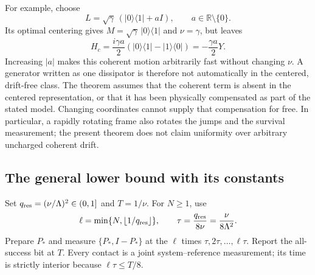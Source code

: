 \documentclass[11pt,a4paper]{article}
\numberwithin{equation}{section}
\theoremstyle{remark}
\newcommand{\R}{\mathbb R}
\begin{document}
For example, choose
\begin{equation}
 L=\sqrt\gamma\,(|0\rangle\langle1|+aI),
 \qquad a\in\R\setminus\{0\}.
\end{equation}
Its optimal centering gives
$M=\sqrt\gamma\,|0\rangle\langle1|$ and $\nu=\gamma$, but leaves
\begin{equation}
 H_c=\frac{i\gamma a}{2}
       (|0\rangle\langle1|-|1\rangle\langle0|)
     =-\frac{\gamma a}{2}Y.
\end{equation}
Increasing $|a|$ makes this coherent motion arbitrarily fast without
changing $\nu$. A generator written as one dissipator is therefore not
automatically in the centered, drift-free class. The theorem assumes
that the coherent term is absent in the centered representation, or
that it has been physically compensated as part of the stated model.
Changing coordinates cannot supply that compensation for free. In
particular, a rapidly rotating frame also rotates the jumps and the
survival measurement; the present theorem does not claim uniformity
over arbitrary uncharged coherent drift.

\subsection{The general lower bound with its constants}

Set $q_{\rm res}=(\nu/\Lambda)^2\in(0,1]$ and $T=1/\nu$. For $N\geq1$, use
\begin{equation}
 \ell=\min\{N,\lfloor1/q_{\rm res}\rfloor\},\qquad
 \tau=\frac{q_{\rm res}}{8\nu}=\frac{\nu}{8\Lambda^2}.
 \label{wit:general-schedule}
\end{equation}
Prepare $P_*$ and measure $\{P_*,I-P_*\}$ at the $\ell$ times
$\tau,2\tau,\ldots,\ell\tau$. Report the all-success bit at $T$.
Every contact is a joint system--reference measurement; its time is
strictly interior because $\ell\tau\leq T/8$.
\end{document}
